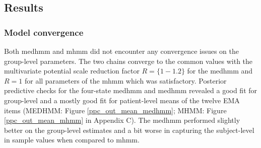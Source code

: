 \subsection{Results}
\subsubsection*{Model convergence}
Both \ac{medhmm} and \ac{mhmm} did not encounter any convergence issues on the group-level parameters. The two chains converge to the common values with the multivariate potential scale reduction factor $R=\{1-1.2\}$ for the \ac{medhmm} and $R=1$ for all parameters of the \ac{mhmm} which was satisfactory.
Posterior predictive checks for the four-state \ac{medhmm} and \ac{medhmm} revealed a good fit for group-level and a mostly good fit for patient-level means of the twelve EMA items (MEDHMM: Figure \ref{ppc_out_mean_medhmm}; MHMM: Figure \ref{ppc_out_mean_mhmm} in Appendix C). The \ac{medhmm} performed slightly better on the group-level estimates and a bit worse in capturing the subject-level in sample values when compared to \ac{mhmm}.
